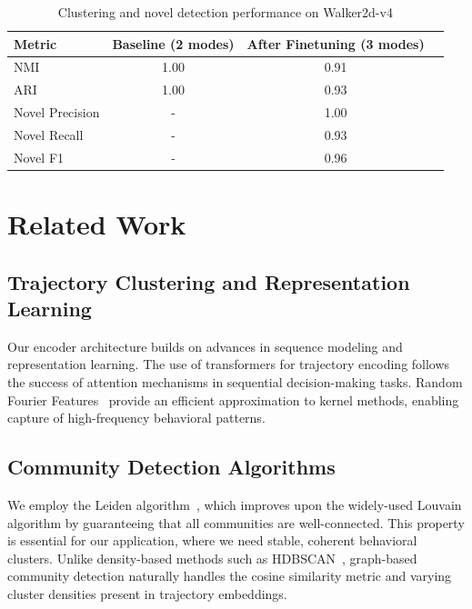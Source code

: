 \documentclass{article}
\begin{document}
\begin{table}[h]
\centering
\begin{tabular}{lccc}
\toprule
\textbf{Metric} & \textbf{Baseline (2 modes)} & \textbf{After Finetuning (3 modes)} \\
\midrule
NMI & 1.00 & 0.91 \\
ARI & 1.00 & 0.93 \\
Novel Precision & - & 1.00 \\
Novel Recall & - & 0.93 \\
Novel F1 & - & 0.96 \\
\bottomrule
\end{tabular}
\caption{Clustering and novel detection performance on Walker2d-v4}
\end{table}

\section{Related Work}

\subsection{Trajectory Clustering and Representation Learning}

Our encoder architecture builds on advances in sequence modeling and representation learning. The use of transformers for trajectory encoding follows the success of attention mechanisms in sequential decision-making tasks. Random Fourier Features~\cite{rahimi2007random} provide an efficient approximation to kernel methods, enabling capture of high-frequency behavioral patterns.

\subsection{Community Detection Algorithms}

We employ the Leiden algorithm~\cite{traag2019louvain}, which improves upon the widely-used Louvain algorithm by guaranteeing that all communities are well-connected. This property is essential for our application, where we need stable, coherent behavioral clusters. Unlike density-based methods such as HDBSCAN~\cite{campello2013density}, graph-based community detection naturally handles the cosine similarity metric and varying cluster densities present in trajectory embeddings.
\end{document}
